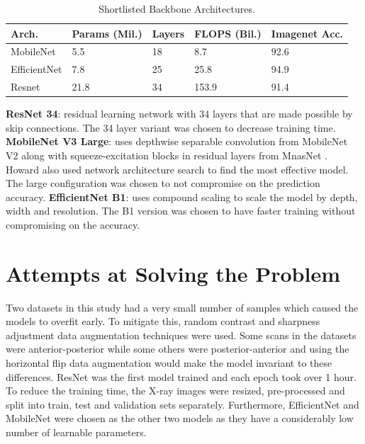 \documentclass[10pt,twocolumn,letterpaper]{article}
\begin{document}
\begin{table}
  \centering
  \begin{tabular}{p{1.7cm}|p{1cm}|p{1cm}|p{1cm}|p{1cm}}
  \toprule
  Arch. & Params (Mil.) & Layers & FLOPS (Bil.) & Imagenet Acc.\\
  \midrule
  MobileNet & 5.5 & 18 & 8.7 & 92.6\\
  \midrule
  EfficientNet & 7.8 & 25 & 25.8 & 94.9\\
  \midrule
  Resnet & 21.8 & 34 & 153.9 & 91.4\\
  \bottomrule
  \end{tabular}
  \caption{Shortlisted Backbone Architectures.}
  \vspace{-1em}
  \label{tab:selArch}
\end{table}
\textbf{ResNet 34}: residual learning network with 34 layers that are made possible by skip connections. The 34 layer variant was chosen to decrease training time. \cite{he2016deep}
\textbf{MobileNet V3 Large}: uses depthwise separable convolution from MobileNet V2 \cite{sandler2018mobilenetv2} along with squeeze-excitation blocks in residual layers from MnasNet \cite{tan2019mnasnet}. Howard \etal \cite{howard2019searching} also used network architecture search to find the most effective model. The large configuration was chosen to not compromise on the prediction accuracy.
\textbf{EfficientNet B1}: uses compound scaling to scale the model by depth, width and resolution. The B1 version was chosen to have faster training without compromising on the accuracy. \cite{tan2019efficientnet}
\section{Attempts at Solving the Problem} 
\label{sec:method}
Two datasets in this study had a very small number of samples which caused the models to overfit early. To mitigate this, random contrast and sharpness adjustment \cite{nanni2021comparison} data augmentation techniques were used. Some scans in the datasets were anterior-posterior while some others were posterior-anterior and using the horizontal flip data augmentation would make the model invariant to these differences\cite{botev2022regularising}.
ResNet was the first model trained and each epoch took over 1 hour. To reduce the training time, the X-ray images were resized, pre-processed and split into train, test and validation sets separately. Furthermore, EfficientNet and MobileNet were chosen as the other two models as they have a considerably low number of learnable parameters. 
\end{document}
